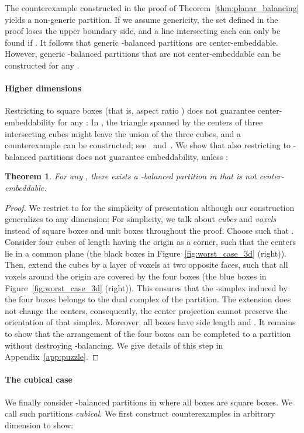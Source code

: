 \documentclass[12pt]{article}
\newtheorem{theorem}{Theorem}
\begin{document}
The counterexample constructed in the proof of Theorem~\ref{thm:planar_balancing}
yields a non-generic partition. If we assume genericity, the set  defined in the proof
loses the upper boundary side, and a line intersecting each  can only be found if .
It follows that generic -balanced partitions are center-embeddable. 
However, generic -balanced partitions that are not center-embeddable 
can be constructed for any .

\paragraph{Higher dimensions} Restricting to square boxes (that is, aspect ratio ) 
does not guarantee
center-embeddability for any : In , the triangle spanned by the centers
of three intersecting cubes might leave the union of the three cubes, and a counterexample
can be constructed; see~\cite{bek-computing} and~\cite{ek-freudenthal}.
We show that also restricting to -balanced partitions does not guarantee embeddability,
unless :


\begin{theorem}\label{thm:beta_balanced_high}
For any , there exists a -balanced partition in  that is not center-embeddable.
\end{theorem}
\begin{proof}
We restrict to  for the simplicity of presentation
although our construction generalizes to any dimension:
For simplicity, we talk about \emph{cubes} and \emph{voxels}
instead of square boxes and unit boxes throughout the proof.
Choose  such that . 
Consider four cubes of length  having the origin as a corner,
such that the centers lie in a common plane 
(the black boxes in Figure~\ref{fig:worst_case_3d} (right)).
Then, extend the cubes by a layer of voxels at two opposite faces, such that 
all voxels around the origin are covered by the four boxes
(the blue boxes in Figure~\ref{fig:worst_case_3d} (right)). 
This ensures that the -simplex induced by the four boxes belongs to the dual complex
of the partition.
The extension does not change the centers, consequently,
the center projection cannot preserve the orientation of that simplex.
Moreover, all boxes have side length  and . It remains to show that
the arrangement of the four boxes can be completed to a partition without
destroying -balancing. We give details of this step
in Appendix~\ref{app:puzzle}.
\end{proof}

\paragraph{The cubical case} We finally consider -balanced partitions
in  where all boxes are square boxes. 
We call such partitions \emph{cubical}.
We first construct
counterexamples in arbitrary dimension to show:
\end{document}
